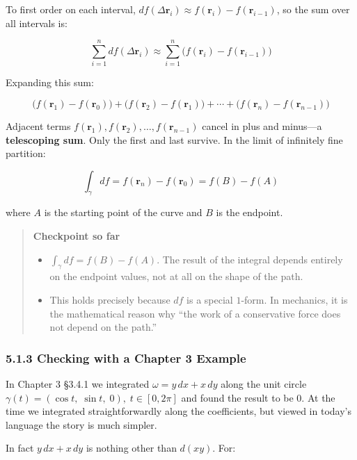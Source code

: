 \documentclass[a4paper,12pt,openany]{book}
\begin{document}
To first order on each interval,
\(df(\Delta\mathbf{r}_i) \approx f(\mathbf{r}_i) - f(\mathbf{r}_{i-1})\),
so the sum over all intervals is:

\[\sum_{i=1}^n df(\Delta\mathbf{r}_i) \approx \sum_{i=1}^n \bigl(f(\mathbf{r}_i) - f(\mathbf{r}_{i-1})\bigr)\]

Expanding this sum:

\[\bigl(f(\mathbf{r}_1)-f(\mathbf{r}_0)\bigr) + \bigl(f(\mathbf{r}_2)-f(\mathbf{r}_1)\bigr) + \cdots + \bigl(f(\mathbf{r}_n)-f(\mathbf{r}_{n-1})\bigr)\]

Adjacent terms
\(f(\mathbf{r}_1), f(\mathbf{r}_2), \dots, f(\mathbf{r}_{n-1})\) cancel
in plus and minus—a \textbf{telescoping sum}. Only the first and last
survive. In the limit of infinitely fine partition:

\[\int_\gamma df = f(\mathbf{r}_n) - f(\mathbf{r}_0) = f(B) - f(A)\]

where \(A\) is the starting point of the curve and \(B\) is the
endpoint.

\begin{quote}
\textbf{Checkpoint so far}

\begin{itemize}
\item
  \(\int_\gamma df = f(B) - f(A)\). The result of the integral depends
  entirely on the endpoint values, not at all on the shape of the path.
\item
  This holds precisely because \(df\) is a special \(1\)-form. In
  mechanics, it is the mathematical reason why ``the work of a
  conservative force does not depend on the path.''
\end{itemize}
\end{quote}

\hypertarget{checking-with-a-chapter-3-example}{%
\subsubsection{5.1.3 Checking with a Chapter 3
Example}\label{checking-with-a-chapter-3-example}}

In Chapter 3 §3.4.1 we integrated \(\omega = y\,dx + x\,dy\) along the
unit circle \(\gamma(t) = (\cos t,\; \sin t,\; 0),\; t \in [0,2\pi]\)
and found the result to be \(0\). At the time we integrated
straightforwardly along the coefficients, but viewed in today's language
the story is much simpler.

In fact \(y\,dx + x\,dy\) is nothing other than \(d(xy)\). For:
\end{document}
